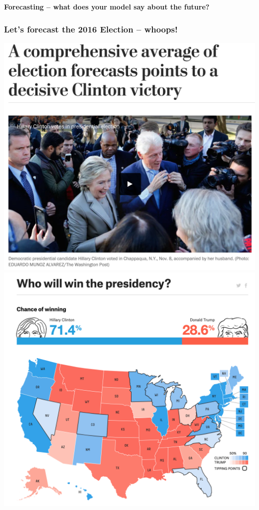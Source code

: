 \documentclass[aspectratio=169]{beamer}
\theoremstyle{principle}
\begin{document}
\begin{frame}

\begin{center}
\Huge\textbf{Forecasting -- what does your model say about the future?}\\
\end{center}

\end{frame}

\begin{frame}
\frametitle{Let's forecast the 2016 Election -- whoops!}

\includegraphics[scale=0.23]{oops-avg.png}
\includegraphics[scale=0.23]{oops-538.png}

\end{frame}
\end{document}
